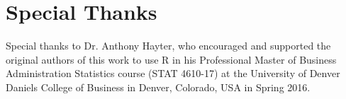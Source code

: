 %
%
%
%
%

\section{Special Thanks}

Special thanks to Dr. Anthony Hayter, who encouraged and supported the 
original authors of this work to use R in his Professional Master of 
Business Administration Statistics course (STAT 4610-17) at the 
University of Denver Daniels College of Business in Denver, Colorado, 
USA in Spring 2016.